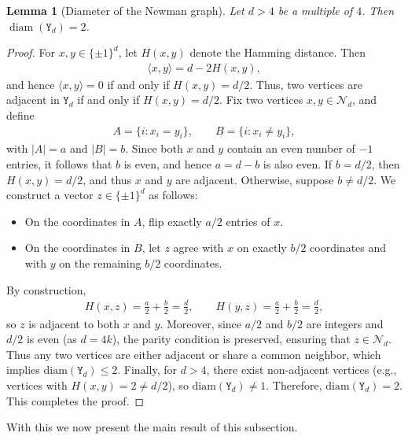 \documentclass[12pt,a4paper]{article}
\newtheorem{lemma}{Lemma}
\begin{document}
\begin{lemma}[Diameter of the Newman graph]\label{lemma2}
Let $d>4$ be a multiple of $4$. Then $\operatorname{diam}(\mathtt{Y}_d)=2$.
\end{lemma}
\begin{proof}
For $x,y \in \{\pm 1\}^d$, let $H(x,y)$ denote the Hamming distance. Then
\begin{align*}
\langle x, y \rangle = d - 2H(x,y),   
\end{align*}
and hence $\langle x, y \rangle = 0$ if and only if $H(x,y)=d/2$. Thus, two vertices are adjacent in $\mathtt{Y}_d$ if and only if $H(x,y)=d/2$. Fix two vertices $x,y \in \mathcal{N}_d$, and define
\begin{align*}
A=\{i: x_i = y_i\}, \qquad B=\{i: x_i \neq y_i\},
\end{align*}
with $|A|=a$ and $|B|=b$. Since both $x$ and $y$ contain an even number of $-1$ entries, it follows that $b$ is even, and hence $a=d-b$ is also even. If $b=d/2$, then $H(x,y)=d/2$, and thus $x$ and $y$ are adjacent. Otherwise, suppose $b \ne d/2$. We construct a vector $z \in \{\pm 1\}^d$ as follows:
\begin{itemize}
\item On the coordinates in $A$, flip exactly $a/2$ entries of $x$.
\item On the coordinates in $B$, let $z$ agree with $x$ on exactly $b/2$ coordinates and with $y$ on the remaining $b/2$ coordinates.
\end{itemize}
By construction,
\begin{align*}
H(x,z)=\frac{a}{2}+\frac{b}{2}=\frac{d}{2}, \qquad
H(y,z)=\frac{a}{2}+\frac{b}{2}=\frac{d}{2},
\end{align*}
so $z$ is adjacent to both $x$ and $y$. Moreover, since $a/2$ and $b/2$ are integers and $d/2$ is even (as $d=4k$), the parity condition is preserved, ensuring that $z \in \mathcal{N}_d$. Thus any two vertices are either adjacent or share a common neighbor, which implies $\mathrm{diam}(\mathtt{Y}_d) \le 2$. Finally, for $d>4$, there exist non-adjacent vertices (e.g., vertices with $H(x,y)=2 \neq d/2$), so $\mathrm{diam}(\mathtt{Y}_d) \neq 1$. Therefore, $\mathrm{diam}(\mathtt{Y}_d)=2$. This completes the proof.
\end{proof}
With this we now present the main result of this subsection. 
\end{document}
